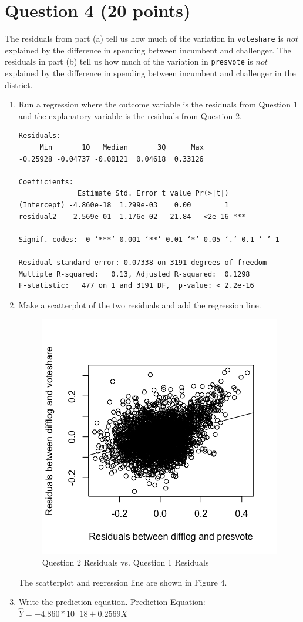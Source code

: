 \documentclass[12pt,letterpaper]{article}
\begin{document}
\newpage	
\section*{Question 4 (20 points)}
\noindent The residuals from part (a) tell us how much of the variation in \texttt{voteshare} is $not$ explained by the difference in spending between incumbent and challenger. The residuals in part (b) tell us how much of the variation in \texttt{presvote} is $not$ explained by the difference in spending between incumbent and challenger in the district.
	\begin{enumerate}
		\item Run a regression where the outcome variable is the residuals from Question 1 and the explanatory variable is the residuals from Question 2.
		  
\begin{verbatim}
Residuals:
     Min       1Q   Median       3Q      Max 
-0.25928 -0.04737 -0.00121  0.04618  0.33126 

Coefficients:
              Estimate Std. Error t value Pr(>|t|)    
(Intercept) -4.860e-18  1.299e-03    0.00        1    
residual2    2.569e-01  1.176e-02   21.84   <2e-16 ***
---
Signif. codes:  0 ‘***’ 0.001 ‘**’ 0.01 ‘*’ 0.05 ‘.’ 0.1 ‘ ’ 1

Residual standard error: 0.07338 on 3191 degrees of freedom
Multiple R-squared:   0.13,	Adjusted R-squared:  0.1298 
F-statistic:   477 on 1 and 3191 DF,  p-value: < 2.2e-16
\end{verbatim}
		\vspace{.6cm}
		\item Make a scatterplot of the two residuals and add the regression line. 
		  
		\begin{figure}[h!]
		\caption{\footnotesize{Question 2 Residuals vs. Question 1 Residuals}}
		\vspace{.001cm}
		\centering
		\label{fig:graph4}
		\includegraphics[width=.5\textwidth]{./PS3_Graph_4.png}
		\end{figure}
		The scatterplot and regression line are shown in Figure 4.
		\vspace{.6cm}
		\item Write the prediction equation.
		Prediction Equation: ${\hat{Y} = -4.860*10^-18 + 0.2569X}$
	\end{enumerate}
	
\end{document}
